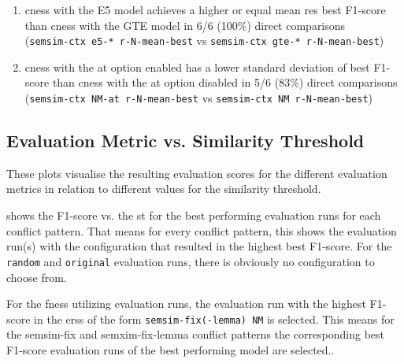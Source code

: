\documentclass[11pt, numbers=noenddot]{scrreprt}
\newcounter{listcounter}
\begin{document}
\begin{enumerate}[label=\arabic{listcounter}.\arabic*]
	\item \gls{cness} with the E5 model achieves a higher or equal mean \gls{res} best F1-score than \gls{cness} with the GTE model in 6/6 (100\%) direct comparisons \\ (\texttt{semsim-ctx e5-* r-N-mean-best} vs \texttt{semsim-ctx gte-* r-N-mean-best}) \label{obs-itm:cness-e5-better-than-gte}
	\item \gls{cness} with the \gls{at} option enabled has a lower standard deviation of best F1-score than \gls{cness} with the \gls{at} option disabled in 5/6 (83\%) direct comparisons \\ (\texttt{semsim-ctx NM-at r-N-mean-best} vs \texttt{semsim-ctx NM r-N-mean-best}) \label{obs-itm:cness-lower-variation-with-at}
\end{enumerate}


\subsection{Evaluation Metric vs. Similarity Threshold}
\label{sec:eval-metrics-vs-st}

These plots visualise the resulting evaluation scores for the different evaluation metrics in relation to different values for the similarity threshold. 

 shows the F1-score vs. the \gls{st} for the best performing evaluation runs for each conflict pattern. That means for every conflict pattern, this shows the evaluation run(s) with the configuration that resulted in the highest best F1-score. For the \texttt{random} and \texttt{original} evaluation runs, there is obviously no configuration to choose from. 

For the \gls{fness} utilizing evaluation runs, the evaluation run with the highest F1-score in the \gls{ers}s of the form \texttt{semsim-fix(-lemma) NM} is selected. This means for the semsim-fix and semxim-fix-lemma conflict patterns the corresponding best F1-score evaluation runs of the best performing model are selected..
\end{document}
